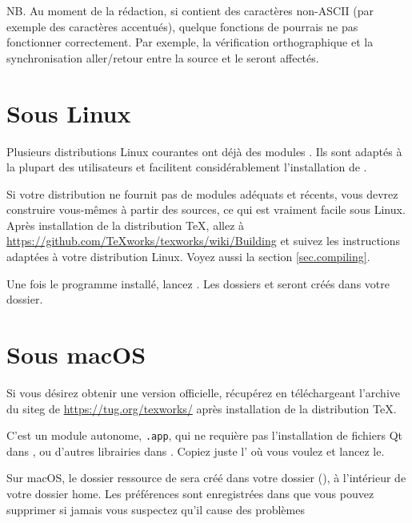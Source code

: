 NB. Au moment de la rédaction, si  contient des caractères non-ASCII (par exemple des caractères accentués), quelque fonctions de {\Tw} pourrais ne pas fonctionner correctement. Par exemple, la vérification orthographique et la synchronisation aller/retour entre la source et le  seront affectés.

\section{Sous Linux}

Plusieurs distributions Linux courantes ont déjà des modules \Tw. Ils sont adaptés à la plupart des utilisateurs et facilitent considérablement l'installation de \Tw.

Si votre distribution ne fournit pas de modules adéquats et récents, vous devrez construire vous-mêmes \Tw{} à partir des sources, ce qui est vraiment facile sous Linux. Après installation de la distribution \TeX, allez à \url{https://github.com/TeXworks/texworks/wiki/Building} et suivez les instructions adaptées à votre distribution Linux. Voyez aussi la section \ref{sec.compiling}.

Une fois le programme installé, lancez {\Tw}. Les dossiers  et  seront créés dans votre dossier.

\section{Sous macOS}

Si vous désirez obtenir une version \og officielle\fg{}, récupérez \Tw{} en téléchargeant l'archive du siteg de \Tw{} \url{https://tug.org/texworks/} après installation de la distribution {\TeX}.

C'est un module autonome, \texttt{.app}, qui ne requière pas l'installation de fichiers Qt dans , ou d'autres librairies dans . Copiez juste l' où vous voulez et lancez le.

Sur macOS, le dossier ressource de {\Tw}  sera créé dans votre dossier  (), à l'intérieur de votre dossier home. Les préférences sont enregistrées dans  
que vous pouvez supprimer si jamais vous suspectez qu'il cause des problèmes

